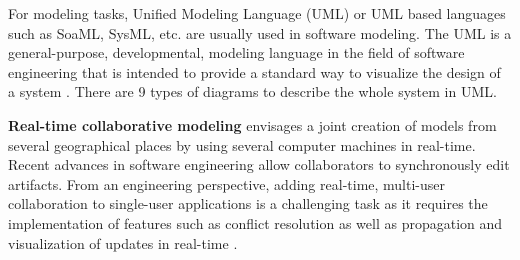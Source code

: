 For modeling tasks, Unified Modeling Language (UML) or UML based languages such as SoaML, SysML, etc. are usually used in software modeling. The UML is a general-purpose, developmental, modeling language in the field of software engineering that is intended to provide a standard way to visualize the design of a system \cite{booch2005unified}. There are 9 types of diagrams to describe the whole system in UML. 

\textbf{Real-time collaborative modeling} envisages a joint creation of models from several geographical places by using several computer machines in real-time. Recent advances in software engineering allow collaborators to synchronously edit artifacts. From an engineering perspective, adding real-time, multi-user collaboration to single-user applications is a challenging task as it requires the implementation of features such as conflict resolution as well as propagation and visualization of updates in real-time \cite{nicolaescu2013browser}. 
